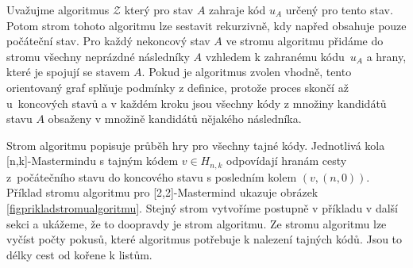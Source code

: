 \begin{pozn}
    Uvažujme algoritmus $\mathcal{Z}$ který pro stav $A$ zahraje kód $u_A$ určený pro tento stav. Potom strom tohoto algoritmu lze sestavit rekurzivně, kdy napřed obsahuje pouze počáteční stav. Pro každý nekoncový stav $A$ ve stromu algoritmu přidáme do stromu všechny neprázdné následníky $A$ vzhledem k zahranému kódu~$u_A$ a hrany, které je spojují se stavem $A$. 
    Pokud je algoritmus zvolen vhodně, tento orientovaný graf splňuje podmínky z definice, protože proces skončí až u~koncových stavů a v každém kroku jsou všechny kódy z množiny kandidátů stavu $A$ obsaženy v množině kandidátů nějakého následníka.
\end{pozn}
 Strom algoritmu popisuje průběh hry pro všechny tajné kódy. Jednotlivá kola [n,k]-Mastermindu s tajným kódem $v\in H_{n,k}$ odpovídají hranám cesty z~počátečního stavu do koncového stavu s posledním kolem $(v,(n,0))$. Příklad stromu algoritmu pro [2,2]-Mastermind ukazuje obrázek \ref{figprikladstromualgoritmu}. Stejný strom vytvoříme postupně v příkladu v další sekci a ukážeme, že to doopravdy je strom algoritmu. Ze stromu algoritmu lze vyčíst počty pokusů, které algoritmus potřebuje k nalezení tajných kódů. Jsou to délky cest od kořene k listům.




